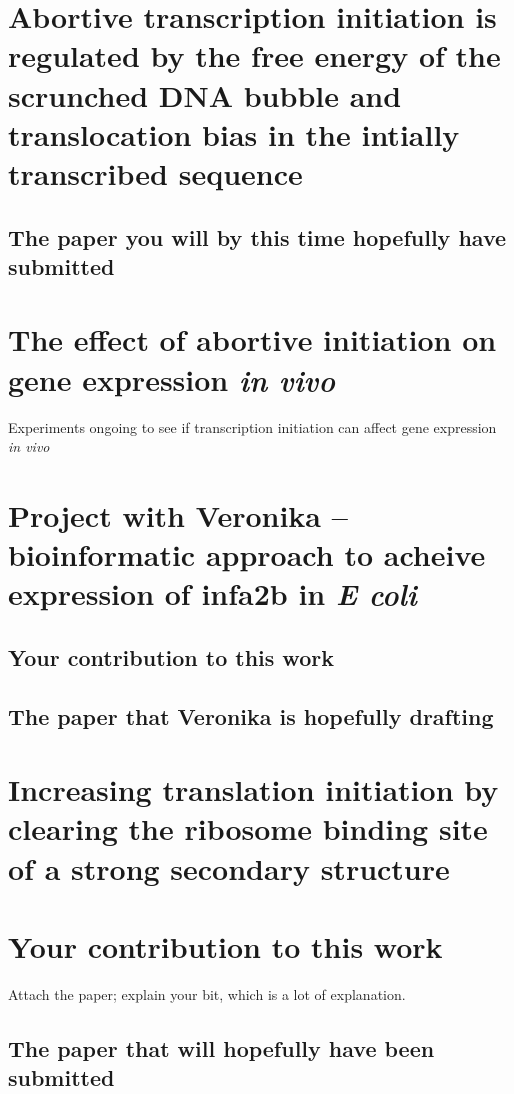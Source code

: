 \documentclass[b5paper]{report}
\begin{document}
\chapter{Abortive transcription initiation is regulated by the free energy of
the scrunched DNA bubble and translocation bias in the intially transcribed
sequence}

\section{The paper you will by this time hopefully have submitted}

\chapter{The effect of abortive initiation on gene expression \textit{in vivo}}
Experiments ongoing to see if transcription initiation can affect gene
expression \textit{in vivo}

\chapter{Project with Veronika -- bioinformatic approach to acheive expression
of infa2b in \textit{E coli}}

\section{Your contribution to this work}

\section{The paper that Veronika is hopefully drafting}

\chapter{Increasing translation initiation by clearing the ribosome binding
site of a strong secondary structure}

\chapter{Your contribution to this work}
Attach the paper; explain your bit, which is a lot of explanation.

\section{The paper that will hopefully have been submitted}
\end{document}

